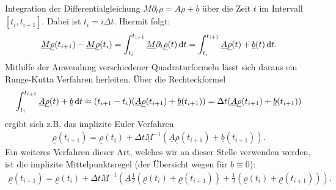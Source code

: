 Integration der Differentialgleichung $\underline{M} \partial_t \underline{\rho} = \underline{A} \underline{\rho} + \underline{b}$ über die Zeit $t$ im Intervall $[t_i, t_{i+1}]$.
Dabei ist $t_i = i \Delta t$. Hiermit folgt:
\begin{align*}
\underline{M}\underline{\rho}(t_{i+1}) - \underline{M}\underline{\rho}(t_i) = \int_{t_i}^{t_{i+1}}
\underline{M} \partial_t \underline{\rho}(t) \, \mathrm{d} t =\int_{t_i}^{t_{i+1}} \underline{A} \underline{\rho}(t) + \underline{b}(t) \, \mathrm{d} t.
\end{align*}
Mithilfe der Anwendung verschiedener Quadraturformeln lässt sich daraus ein Runge-Kutta Verfahren herleiten. Über die Rechteckformel 
\begin{align*}
\int_{t_i}^{t_{i+1}}\underline{A} \underline{\rho}(t) + \underline{b} \, \mathrm{d} t \approx (t_{i+1}-t_i)( 
\underline{A} \underline{\rho}(t_{i+1}) + \underline{b}(t_{i+1})) = \Delta t (\underline{A} \underline{\rho}(t_{i+1}) + \underline{b}(t_{i+1}))
\end{align*}
ergibt sich z.B. das implizite Euler Verfahren
\begin{align*}
\underline{\rho}(t_{i+1}) = \underline{\rho}(t_{i}) + \Delta t \underline{M}^{-1}(\underline{A} \underline{\rho}(t_{i+1}) + \underline{b}(t_{i+1})).
\end{align*}
Ein weiteres Verfahren dieser Art, welches wir an dieser Stelle verwenden werden, ist die implizite Mittelpunktsregel (der Übersicht wegen für $\underline{b} \equiv 0$):
\begin{align*}
\underline{\rho}(t_{i+1}) = \underline{\rho}(t_{i}) +
\Delta t \underline{M}^{-1} (
\underline{A} 
\tfrac{1}{2}(\underline{\rho}(t_{i}) +
\underline{\rho}(t_{i+1}) )
+
\tfrac{1}{2} ( \underline{\rho}(t_{i}) +
\underline{\rho}(t_{i+1}) )).
\end{align*}

